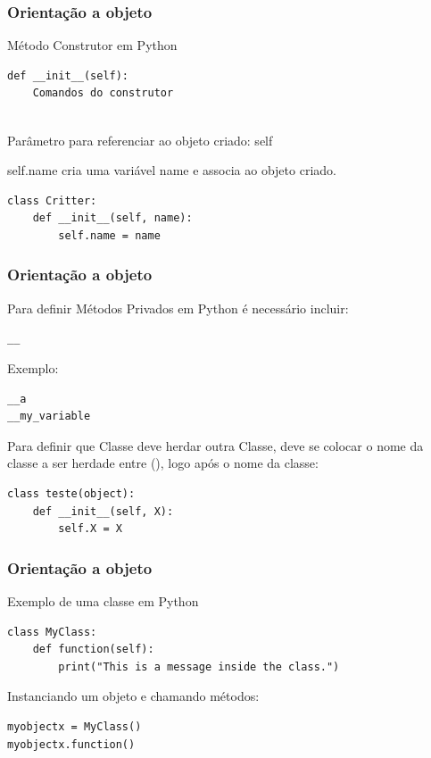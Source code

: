 \documentclass[aspectratio=169]{beamer} %
\begin{document}
\begin{frame}[fragile] \frametitle{Orientação a objeto}
Método Construtor em Python

\begin{verbatim}
def __init__(self):
    Comandos do construtor
    
\end{verbatim}


Parâmetro para referenciar ao objeto criado: self

self.name cria uma variável name e associa ao objeto criado.

\begin{verbatim}
class Critter:
    def __init__(self, name):
        self.name = name
\end{verbatim}

\end{frame}

\begin{frame}[fragile] \frametitle{Orientação a objeto}

Para definir Métodos Privados em Python é necessário incluir: \begin{verbatim}__\end{verbatim}

Exemplo:
\begin{verbatim}
__a 
__my_variable
\end{verbatim}

Para definir que Classe deve herdar outra Classe, deve se colocar o nome da classe a ser herdade entre (), logo após o nome da classe:

\begin{verbatim}
class teste(object):
    def __init__(self, X):
        self.X = X
\end{verbatim}


\end{frame}

\begin{frame}[fragile] \frametitle{Orientação a objeto}

Exemplo de uma classe em Python
\begin{verbatim}
class MyClass:
    def function(self):
        print("This is a message inside the class.")
\end{verbatim}

Instanciando um objeto e chamando métodos:
\begin{verbatim}
myobjectx = MyClass()
myobjectx.function()
\end{verbatim}

\end{frame}
\end{document}
